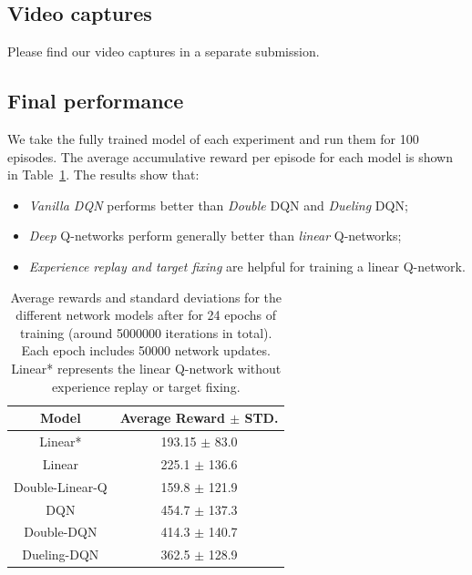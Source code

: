 \documentclass{article}
\begin{document}
\subsection{Video captures}
Please find our video captures in a separate submission. 

\subsection{Final performance}
We take the fully trained model of each experiment and run them for 100 episodes. The average accumulative reward per episode for each model is shown in Table~\ref{tab:final}. The results show that:
\begin{itemize}
\item {\em Vanilla DQN} performs better than {\em Double} DQN and {\em Dueling} DQN; 
\item {\em Deep} Q-networks perform generally better than {\em linear} Q-networks;
\item {\em Experience replay and target fixing} are helpful for training a linear Q-network. 
\end{itemize}

\begin{table}
\begin{center}
 \begin{tabular}{||c | c||} 
 \hline
 Model & Average Reward $\pm$ STD. \\ [0.5ex] 
 \hline\hline
 Linear* & 193.15 $\pm$ 83.0 \\
 \hline
 Linear & 225.1 $\pm$ 136.6 \\  
 \hline
 Double-Linear-Q & 159.8 $\pm$ 121.9 \\
 \hline
 DQN & 454.7 $\pm$ 137.3 \\
 \hline
 Double-DQN & 414.3 $\pm$ 140.7 \\  
 \hline
 Dueling-DQN & 362.5 $\pm$ 128.9 \\ 
 \hline
\end{tabular}
\end{center}
\caption{Average rewards and standard deviations for the different network models after for 24 epochs of training (around 5000000 iterations in total). Each epoch includes 50000 network updates. Linear* represents the linear Q-network without experience replay or target fixing. }
\label{tab:final}
\end{table}
\end{document}
